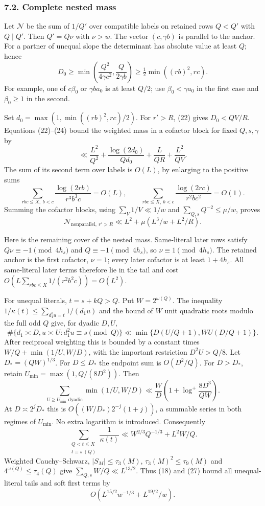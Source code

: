 \documentclass[
  english,
  11pt,
]{article}
\begin{document}
\subsubsection{7.2. Complete nested mass}\label{complete-nested-mass}

Let \(\mathcal N\) be the sum of \(1/Q'\) over compatible labels on
retained rows \(Q<Q'\) with \(Q\mid Q'\). Then \(Q'=Q\nu\) with
\(\nu>w\). The vector \((c,\gamma b)\) is parallel to the anchor. For a
partner of unequal slope the determinant has absolute value at least
\(Q\); hence \[
D_0\ge\min\left(\frac{Q^2}{4\gamma c^2},\frac Q{2\gamma b}\right)
\ge\tfrac12\min((rb)^2,rc). \tag{24}
\] For example, one of \(c\beta_0\) or \(\gamma ba_0\) is at least
\(Q/2\); use \(\beta_0<\gamma a_0\) in the first case and
\(\beta_0\ge1\) in the second.

Set \(d_0=\max(1,\min((rb)^2,rc)/2)\). For \(r'>R\), (22) gives
\(D_0<QV/R\). Equations (22)--(24) bound the weighted mass in a cofactor
block for fixed \(Q,s,\gamma\) by \[
\ll\frac{L^2}{Q^2}+\frac{\log(2d_0)}{Qd_0}
+\frac{L}{QR}+\frac{L^2}{QV}. \tag{25}
\] The sum of its second term over labels is \(O(L)\), by enlarging to
the positive sums \[
\sum_{rbc\le X,\ b<c}\frac{\log(2rb)}{r^3b^3c}=O(L),\qquad
\sum_{rbc\le X,\ b<c}\frac{\log(2rc)}{r^2bc^2}=O(1).
\] Summing the cofactor blocks, using \(\sum_V1/V\ll1/w\) and
\(\sum_{Q,s}Q^{-2}\le\mu/w\), proves \[
\mathcal N_{\mathrm{nonparallel},\ r'>R}
\ll L^2+\mu(L^3/w+L^2/R). \tag{26}
\]

Here is the remaining cover of the nested mass. Same-literal later rows
satisfy \(Q\nu\equiv-1\pmod{4h_s}\) and \(Q\equiv-1\pmod{4h_s}\), so
\(\nu\equiv1\pmod{4h_s}\). The retained anchor is the first cofactor,
\(\nu=1\); every later cofactor is at least \(1+4h_s\). All same-literal
later terms therefore lie in the tail and cost
\(O(L\sum_{rbc\le X}1/(r^2b^2c))=O(L^2)\).

For unequal literals, \(t=s+kQ>Q\). Put \(W=2^{\omega(Q)}\). The
inequality \(1/\kappa(t)\le\sum_{d_1^2u=t}1/(d_1u)\) and the bound of
\(W\) unit quadratic roots modulo the full odd \(Q\) give, for dyadic
\(D,U\), \[
\#\{d_1\asymp D,u\asymp U:d_1^2u\equiv s\pmod Q\}
\ll\min\{D(U/Q+1),WU(D/Q+1)\}.
\] After reciprocal weighting this is bounded by a constant times
\(W/Q+\min(1/U,W/D)\), with the important restriction \(D^2U>Q/8\). Let
\(D_*=(QW)^{1/3}\). For \(D\le D_*\) the endpoint sum is \(O(D^2/Q)\).
For \(D>D_*\), retain \(U_{\min}=\max(1,Q/(8D^2))\). Then \[
\sum_{U\ge U_{\min}\text{ dyadic}}\min(1/U,W/D)
\ll\frac WD\left(1+\log^+\frac{8D^3}{QW}\right).
\] At \(D\asymp2^jD_*\) this is \(O((W/D_*)2^{-j}(1+j))\), a summable
series in both regimes of \(U_{\min}\). No extra logarithm is
introduced. Consequently \[
\sum_{\substack{Q<t\le X\\t\equiv s\ (Q)}}\frac1{\kappa(t)}
\ll W^{2/3}Q^{-1/3}+L^2W/Q. \tag{27}
\] Weighted Cauchy--Schwarz, \(|S_M|\le\tau_3(M)\),
\(\tau_3(M)^2\le\tau_9(M)\) and \(4^{\omega(Q)}\le\tau_4(Q)\) give
\(\sum_{Q,s}W/Q\ll L^{13/2}\). Thus (18) and (27) bound all
unequal-literal tails and soft first terms by \[
O(L^{15/2}w^{-1/3}+L^{19/2}/w). \tag{28}
\]
\end{document}
